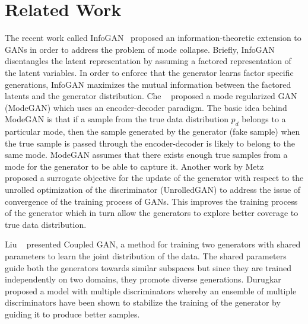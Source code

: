 \section{Related Work}
The recent work called InfoGAN~\cite{chen2016infogan} proposed an information-theoretic extension to GANs in order to address the problem of mode collapse. Briefly, InfoGAN disentangles the latent representation by assuming a factored representation of the latent variables. In order to enforce that the generator learns factor specific generations, InfoGAN maximizes the mutual information between the factored latents and the generator distribution. 
Che \etal~\cite{che2016mode} proposed a mode regularized GAN (ModeGAN) which uses an encoder-decoder paradigm. The basic idea behind ModeGAN is that if a sample from the true data distribution $p_d$ belongs to a particular mode, then the sample generated by the generator (fake sample) when the true sample is passed through the encoder-decoder is likely to belong to the same mode. ModeGAN assumes that there exists enough true samples from a mode for the generator to be able to capture it.
Another work by Metz \etal~\cite{metz2017unrolledGAN} proposed a surrogate objective for the update of the generator with respect to the unrolled optimization of the discriminator (UnrolledGAN) to address the issue of convergence of the training process of GANs. This improves the training process of the generator which in turn allow the generators to explore better coverage to true data distribution. 

Liu \etal~\cite{liu2016coupled} presented Coupled GAN, a method for training two generators with shared parameters to learn the joint distribution of the data. The shared parameters guide both the generators towards similar subspaces but since they are trained independently on two domains, they promote diverse generations. Durugkar \etal~\cite{durugkar2016generative} proposed a model with multiple discriminators whereby an ensemble of multiple discriminators have been shown to stabilize the training of the generator by guiding it to produce better samples. 

